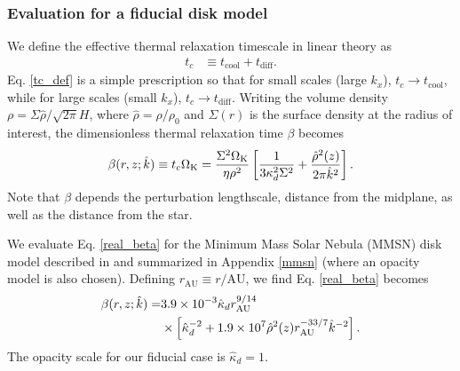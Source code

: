 \subsubsection{Evaluation for a fiducial disk model}\label{toy_relax}
We define the effective thermal relaxation timescale in linear theory as
\begin{align}\label{tc_def}
  t_c &\equiv t_\mathrm{cool} + t _\mathrm{diff}. %
\end{align}
Eq. \ref{tc_def} is a simple prescription so
that for small scales (large $k_x$), $t_c\to t_\mathrm{cool}$, while
for large scales (small $k_x$), $t_c\to t_\mathrm{diff}$. Writing the
volume density $\rho = \Sigma\hat{\rho}/\sqrt{2\pi}H$, where
$\hat{\rho} = \rho/\rho_0$ and $\Sigma(r)$ is the surface density at the
radius of interest, the dimensionless thermal
relaxation time $\beta$ becomes 
\begin{align}\label{real_beta}
  \beta(r,z;\hat{k}) \equiv t_c\Omega_{\rm K} =
  \frac{\Sigma^2\Omega_{\rm K}}{\eta\rho^2}\left[\frac{1}{3\kappa_d^2\Sigma^2} 
    + \frac{\hat{\rho}^2(z)}{2\pi \hat{k}^2}\right].
\end{align}
Note that $\beta$ depends the perturbation lengthscale, 
distance from the midplane, as well as the distance from the star.  


We evaluate Eq. \ref{real_beta} for the Minimum Mass Solar Nebula
(MMSN) disk model described in \cite{chiang10} and summarized in
Appendix \ref{mmsn} (where an opacity model is also chosen). Defining
$r_\mathrm{AU}\equiv r/\mathrm{AU}$, we find Eq. \ref{real_beta}
becomes 
\begin{align}\label{beta_mmsn_simp}
  \beta(r,z;\hat{k})\notag = &3.9\times10^{-3}\hat{\kappa}_d
  r_\mathrm{AU}^{9/14}
  \notag\\ &\times \left[\hat{\kappa}_d^{-2} +
    1.9\times10^7\hat{\rho}^2(z)r_\mathrm{AU}^{-33/7}\hat{k}^{-2}\right]. 
\end{align}
The opacity scale for our fiducial case is $\hat{\kappa}_d=1$.    

